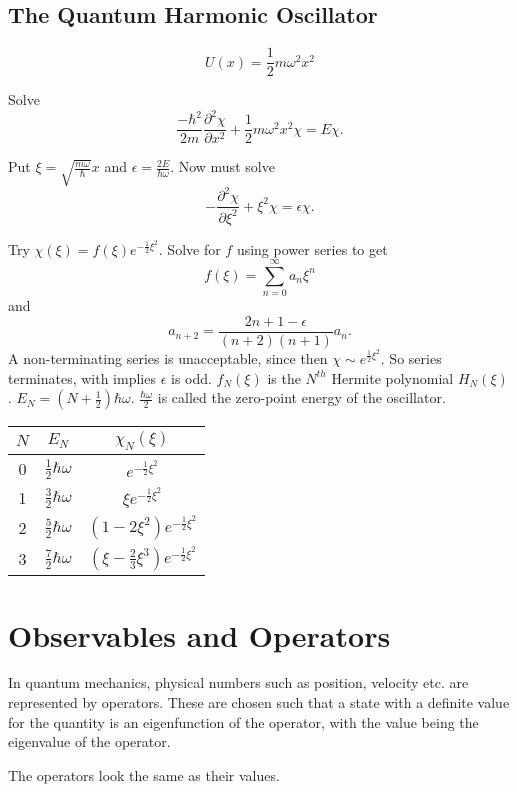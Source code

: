 \documentclass[a4paper]{article}
\newcommand{\pd}[2]{\frac{\partial #1}{\partial #2}}
\begin{document}
\subsection{The Quantum Harmonic Oscillator}

\[
U(x)=\frac{1}{2}m \omega^2 x^2
\]

Solve
\[
\frac{-\hbar^2}{2 m} \pd{^2 \chi}{x^2} + \frac{1}{2} m \omega^2 x^2 \chi = E\chi.
\]

Put $\xi = \sqrt{\frac{m \omega}{\hbar}}x$ and $\epsilon = \frac{2 E}{\hbar \omega}$.  Now must solve
\[
-\pd{^2\chi}{\xi^2} + \xi^2 \chi = \epsilon \chi.
\]

Try $\chi(\xi) = f(\xi)e^{-\frac{1}{2}\xi^2}$.  Solve for $f$ using power
series to get
\[
f(\xi) = \sum_{n=0}^{\infty}a_n\xi^n
\]
and
\[
a_{n+2}=\frac{2 n + 1 - \epsilon}{(n+2)(n+1)}a_n.
\]
A non-terminating series is unacceptable, since then $\chi \sim e^{\frac{1}{2}\xi^2}$.  So series terminates, with implies $\epsilon$ is odd. $f_N(\xi)$
is the $N^{th}$ Hermite polynomial $H_N(\xi)$.  $E_N = (N + \frac{1}{2})\hbar \omega$.  $\frac{\hbar \omega}{2}$ is called the zero-point energy of the
oscillator.

\begin{center}
\begin{tabular}{ c | c | c}
$N$     & $E_N$ & $\chi_N(\xi)$ \\ \hline \hline
0       & $\frac{1}{2} \hbar \omega$    & $e^{-\frac{1}{2}\xi^2}$ \\
1       & $\frac{3}{2} \hbar \omega$    & $\xi e^{-\frac{1}{2}\xi^2}$ \\
2       & $\frac{5}{2} \hbar \omega$    & $(1-2 \xi^2)e^{-\frac{1}{2}\xi^2}$ \\
3       & $\frac{7}{2} \hbar \omega$    & $(\xi - \frac{2}{3}\xi^3)e^{-\frac{1}{2}\xi^2}$ \\
\end{tabular}
\end{center}

\section{Observables and Operators}

In quantum mechanics, physical numbers such as position, velocity etc. are
represented by operators.  These are chosen such that a state with a definite
value for the quantity is an eigenfunction of the operator, with the value
being the eigenvalue of the operator.

The operators look the same as their values.
\end{document}
